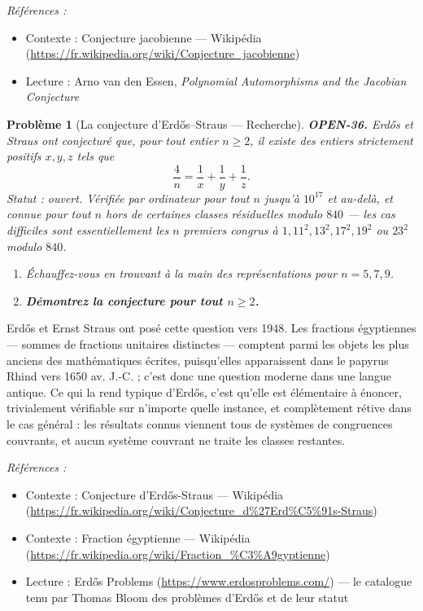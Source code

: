 \documentclass[11pt]{article}
\newtheorem{problem}{Problème}
\newenvironment{refs}{\par\small\noindent\emph{Références :}\begin{itemize}\setlength\itemsep{0pt}}{\end{itemize}\normalsize}
\begin{document}
\begin{refs}
\item Contexte : Conjecture jacobienne --- Wikipédia (\url{https://fr.wikipedia.org/wiki/Conjecture_jacobienne})
\item Lecture : Arno van den Essen, \textit{Polynomial Automorphisms and the Jacobian Conjecture}
\end{refs}

\bigskip

\begin{problem}[{La conjecture d'Erd\H{o}s--Straus --- Recherche}]
\textbf{OPEN-36.} Erd\H{o}s et Straus ont conjecturé que, pour tout entier $ n \geq 2 $,
il existe des entiers strictement positifs $ x, y, z $ tels que
\[ \frac{4}{n} = \frac{1}{x} + \frac{1}{y} + \frac{1}{z} . \]
Statut : ouvert. Vérifiée par ordinateur pour tout $ n $ jusqu'à $ 10^{17} $ et
au-delà, et connue pour tout $ n $ hors de certaines classes résiduelles modulo
$ 840 $ --- les cas difficiles sont essentiellement les $ n $ premiers congrus à
$ 1, 11^2, 13^2, 17^2, 19^2 $ ou $ 23^2 $ modulo $ 840 $.
\begin{enumerate}
\item[(a)] Échauffez-vous en trouvant à la main des représentations pour $ n = 5, 7, 9 $.
\item[(b)] \textbf{Démontrez la conjecture pour tout $ n \geq 2 $.}
\end{enumerate}

\end{problem}

\noindent Erd\H{o}s et Ernst Straus ont posé cette question vers 1948. Les fractions
égyptiennes --- sommes de fractions unitaires distinctes --- comptent parmi les objets les
plus anciens des mathématiques écrites, puisqu'elles apparaissent dans le papyrus Rhind
vers 1650 av. J.-C. ; c'est donc une question moderne dans une langue antique. Ce qui la
rend typique d'Erd\H{o}s, c'est qu'elle est élémentaire à énoncer, trivialement vérifiable sur
n'importe quelle instance, et complètement rétive dans le cas général : les résultats
connus viennent tous de systèmes de congruences couvrants, et aucun système couvrant ne
traite les classes restantes.

\begin{refs}
\item Contexte : Conjecture d'Erd\H{o}s-Straus --- Wikipédia (\url{https://fr.wikipedia.org/wiki/Conjecture_d%27Erd%C5%91s-Straus})
\item Contexte : Fraction égyptienne --- Wikipédia (\url{https://fr.wikipedia.org/wiki/Fraction_%C3%A9gyptienne})
\item Lecture : Erd\H{o}s Problems (\url{https://www.erdosproblems.com/}) --- le catalogue tenu par Thomas Bloom des problèmes d'Erd\H{o}s et de leur statut
\end{refs}
\end{document}

